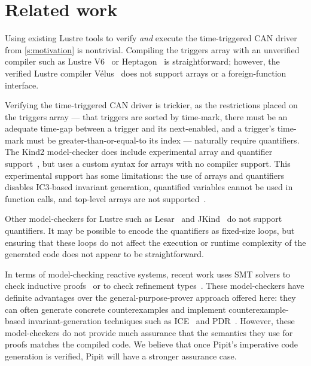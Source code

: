 
\section{Related work}
\label{s:related-work}

Using existing Lustre tools to verify \emph{and} execute the time-triggered CAN driver from \autoref{s:motivation} is nontrivial.
Compiling the triggers array with an unverified compiler such as Lustre V6~\cite{jahier2016lustre} or Heptagon~\cite{gerard2012modular} is straightforward; however, the verified Lustre compiler Vélus~\cite{bourke2023verified} does not support arrays or a foreign-function interface.

Verifying the time-triggered CAN driver is trickier, as the restrictions placed on the triggers array --- that triggers are sorted by time-mark, there must be an adequate time-gap between a trigger and its next-enabled, and a trigger's time-mark must be greater-than-or-equal-to its index --- naturally require quantifiers.
The Kind2 model-checker does include experimental array and quantifier support~\cite{kind2userdoc}, but uses a custom syntax for arrays with no compiler support.
This experimental support has some limitations: the use of arrays and quantifiers disables IC3-based invariant generation, quantified variables cannot be used in function calls, and top-level arrays are not supported~\cite{kind2024toparray}.

Other model-checkers for Lustre such as Lesar~\cite{raymond2008synchronous} and JKind~\cite{gacek2018jkind} do not support quantifiers.
It may be possible to encode the quantifiers as fixed-size loops, but ensuring that these loops do not affect the execution or runtime complexity of the generated code does not appear to be straightforward.

 \cite{brun2023equation}

In terms of model-checking reactive systems,
recent work uses SMT solvers to check inductive proofs~\cite{hagen2008scaling,champion2016kind2} or to check refinement types~\cite{chen2022synchronous}.
These model-checkers have definite advantages over the general-purpose-prover approach offered here: they can often generate concrete counterexamples and implement counterexample-based invariant-generation techniques such as ICE~\cite{garg2014ice} and PDR~\cite{bradley2011sat,een2011efficient}.
However, these model-checkers do not provide much assurance that the semantics they use for proofs matches the compiled code.
We believe that once Pipit's imperative code generation is verified, Pipit will have a stronger assurance case.


